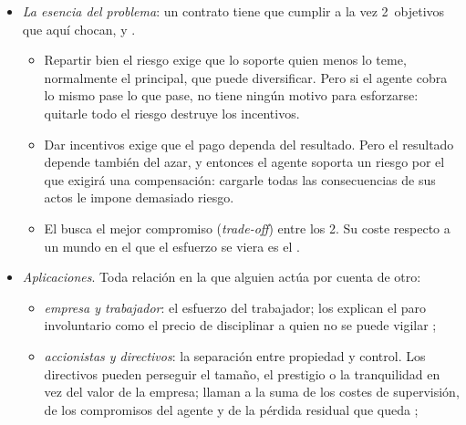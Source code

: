 \documentclass[11pt]{article}
\begin{document}
\begin{itemize}
\begin{enumerate}[ref=\arabic*]
  \item\label{cond:rm-conflicto} \emph{Conflicto de intereses}: el esfuerzo cuesta al agente y beneficia al principal. Si no, el agente haría lo que conviene al principal sin necesidad de incentivos.
  \item\label{cond:rm-riesgo} \emph{Riesgo y aversión al riesgo de alguna de las partes}: el resultado no depende solo del esfuerzo, sino también del azar (si dependiera solo del esfuerzo, el resultado lo revelaría), y alguien es averso al riesgo, porque si no, como veremos, el problema se resuelve sin coste.
  \end{enumerate}
\item \emph{La esencia del problema}: un contrato tiene que cumplir a la vez 2~objetivos que aquí chocan,  y .
  \begin{itemize}
  \item Repartir bien el riesgo exige que lo soporte quien menos lo teme, normalmente el principal, que puede diversificar. Pero si el agente cobra lo mismo pase lo que pase, no tiene ningún motivo para esforzarse: quitarle todo el riesgo destruye los incentivos.
  \item Dar incentivos exige que el pago dependa del resultado. Pero el resultado depende también del azar, y entonces el agente soporta un riesgo por el que exigirá una compensación: cargarle todas las consecuencias de sus actos le impone demasiado riesgo.
  \item El  busca el mejor compromiso (\emph{trade-off}) entre los 2. Su coste respecto a un mundo en el que el esfuerzo se viera es el .
  \end{itemize}
\item \emph{Aplicaciones}. Toda relación en la que alguien actúa por cuenta de otro:
  \begin{itemize}
  \item \emph{empresa y trabajador}: el esfuerzo del trabajador; los  explican el paro involuntario como el precio de disciplinar a quien no se puede vigilar\nocite{ShapiroStiglitz1984Equilibrium} ;
  \item \emph{accionistas y directivos}: la separación entre propiedad y control. Los directivos pueden perseguir el tamaño, el prestigio o la tranquilidad en vez del valor de la empresa; \textcite{JensenMeckling1976Theory} llaman  a la suma de los costes de supervisión, de los compromisos del agente y de la pérdida residual que queda ;

\end{itemize}
\end{itemize}
\end{document}
